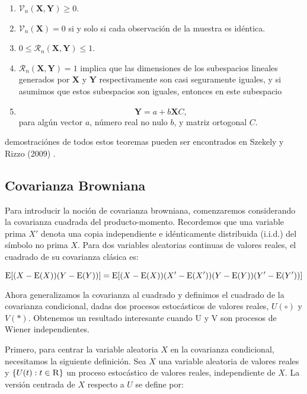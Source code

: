 	\begin{thm}
	\begin{enumerate}
		\item $\mathcal{V}_n(\mathbf{X}, \mathbf{Y}) \geq 0$.
		\item $\mathcal{V}_n(\mathbf{X})=0$ si y solo si cada observaci\'on de la muestra es id\'entica.
		\item $0 \leq \mathcal{R}_n(\mathbf{X}, \mathbf{Y}) \leq 1$.
		\item $\mathcal{R}_n(\mathbf{X}, \mathbf{Y})=1$ implica que las dimensiones de los subespacios lineales generados por $\mathbf{X}$ y $\mathbf{Y}$ respectivamente son casi seguramente iguales, y si asumimos que estos subespacios son iguales, entonces en este subespacio
		\item $$
		\mathbf{Y}=a+b \mathbf{X} C,
		$$
		para alg\'un vector $a$, n\'umero real no nulo $b$, y matriz ortogonal $C$.
	\end{enumerate}	
	\end{thm}
	demostraci\'ones de todos estos teoremas pueden ser encontrados en Szekely y Rizzo (2009) \cite{Szekely2009}.

	\subsection{Covarianza Browniana}
		
		Para introducir la noci\'on de covarianza browniana, comenzaremos considerando la covarianza cuadrada del producto-momento. Recordemos que una variable prima $X'$ denota una copia independiente e id\'enticamente distribuida (i.i.d.) del símbolo no prima $X$. Para dos variables aleatorias continuas de valores reales, el cuadrado de su covarianza clásica es:

		$$\operatorname{E}[(X-\operatorname{E}(X))(Y-\operatorname{E}(Y))] = \operatorname{E}[(X-\operatorname{E}(X))(X'-\operatorname{E}(X'))(Y-\operatorname{E}(Y))(Y'-\operatorname{E}(Y'))]	$$

		Ahora generalizamos la covarianza al cuadrado y definimos el cuadrado de la covarianza condicional, dadas dos procesos estocásticos de valores reales, $U(\circ)$ y $V(*)$. Obtenemos un resultado interesante cuando U y V son procesos de Wiener independientes.


		Primero, para centrar la variable aleatoria $X$ en la covarianza condicional, necesitamos la siguiente definici\'on. Sea $X$ una variable aleatoria de valores reales y $\{U(t): t \in \textsc{R}\}$ un proceso estoc\'astico de valores reales, independiente de $X$. La versi\'on centrada de $X$ respecto a $U$ se define por:

